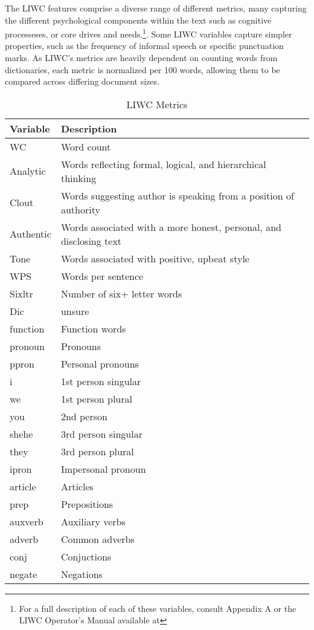 \documentclass[../thesis.tex]{subfiles}
\begin{document}
The LIWC features comprise a diverse range of different metrics, many capturing the different psychological components within the text such as cognitive processeses, or core drives and needs.\footnote{For a full description of each of these variables, consult Appendix A or the LIWC Operator's Manual available at}. Some LIWC variables capture simpler properties, such as the frequency of informal speech or specific punctuation marks. As LIWC's metrics are heavily dependent on counting words from dictionaries, each metric is normalized per 100 words, allowing them to be compared across differing document sizes.

\begin{longtable}[t]{ll}
\caption{\label{tab:}LIWC Metrics}\\
\toprule
Variable & Description\\
\midrule
WC & Word count\\
Analytic & Words reflecting formal, logical, and hierarchical thinking\\
Clout & Words suggesting author is speaking from a position of authority\\
Authentic & Words associated with a more honest, personal, and disclosing text\\
Tone & Words associated with positive, upbeat style\\
\addlinespace
WPS & Words per sentence\\
Sixltr & Number of six+ letter words\\
Dic & unsure\\
function & Function words\\
pronoun & Pronouns\\
\addlinespace
ppron & Personal pronouns\\
i & 1st person singular\\
we & 1st person plural\\
you & 2nd person\\
shehe & 3rd person singular\\
\addlinespace
they & 3rd person plural\\
ipron & Impersonal pronoun\\
article & Articles\\
prep & Prepositions\\
auxverb & Auxiliary verbs\\
\addlinespace
adverb & Common adverbs\\
conj & Conjuctions\\
negate & Negations\\

\end{longtable}
\end{document}
